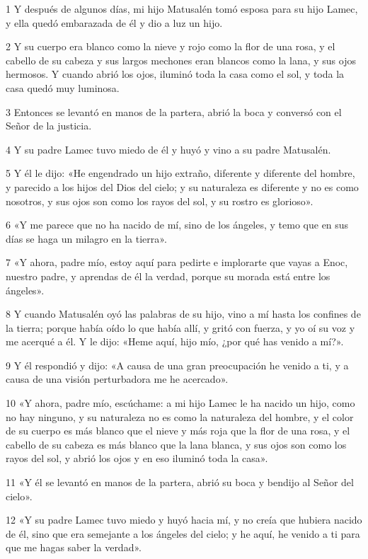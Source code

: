 \par 1 Y después de algunos días, mi hijo Matusalén tomó esposa para su hijo Lamec, y ella quedó embarazada de él y dio a luz un hijo.
\par 2 Y su cuerpo era blanco como la nieve y rojo como la flor de una rosa, y el cabello de su cabeza y sus largos mechones eran blancos como la lana, y sus ojos hermosos. Y cuando abrió los ojos, iluminó toda la casa como el sol, y toda la casa quedó muy luminosa.
\par 3 Entonces se levantó en manos de la partera, abrió la boca y conversó con el Señor de la justicia.
\par 4 Y su padre Lamec tuvo miedo de él y huyó y vino a su padre Matusalén.
\par 5 Y él le dijo: «He engendrado un hijo extraño, diferente y diferente del hombre, y parecido a los hijos del Dios del cielo; y su naturaleza es diferente y no es como nosotros, y sus ojos son como los rayos del sol, y su rostro es glorioso».
\par 6 «Y me parece que no ha nacido de mí, sino de los ángeles, y temo que en sus días se haga un milagro en la tierra».
\par 7 «Y ahora, padre mío, estoy aquí para pedirte e implorarte que vayas a Enoc, nuestro padre, y aprendas de él la verdad, porque su morada está entre los ángeles».
\par 8 Y cuando Matusalén oyó las palabras de su hijo, vino a mí hasta los confines de la tierra; porque había oído lo que había allí, y gritó con fuerza, y yo oí su voz y me acerqué a él. Y le dijo: «Heme aquí, hijo mío, ¿por qué has venido a mí?».
\par 9 Y él respondió y dijo: «A causa de una gran preocupación he venido a ti, y a causa de una visión perturbadora me he acercado».
\par 10 «Y ahora, padre mío, escúchame: a mi hijo Lamec le ha nacido un hijo, como no hay ninguno, y su naturaleza no es como la naturaleza del hombre, y el color de su cuerpo es más blanco que el nieve y más roja que la flor de una rosa, y el cabello de su cabeza es más blanco que la lana blanca, y sus ojos son como los rayos del sol, y abrió los ojos y en eso iluminó toda la casa».
\par 11 «Y él se levantó en manos de la partera, abrió su boca y bendijo al Señor del cielo».
\par 12 «Y su padre Lamec tuvo miedo y huyó hacia mí, y no creía que hubiera nacido de él, sino que era semejante a los ángeles del cielo; y he aquí, he venido a ti para que me hagas saber la verdad».
